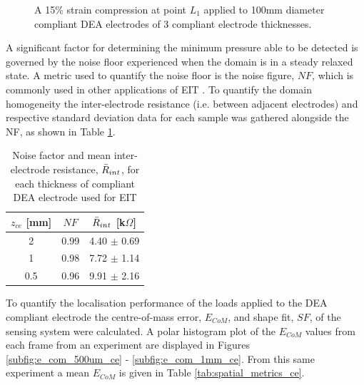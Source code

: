 \begin{figure}[H]
	\vspace{0.1cm}
	\caption{A 15\% strain compression at point $L_1$ applied to 100mm diameter compliant DEA electrodes of 3 compliant electrode thicknesses.}
	\label{fig:EIT_thickness_compare}
\end{figure}
A significant factor for determining the minimum pressure able to be detected is governed by the noise floor experienced when the domain is in a steady relaxed state. A metric used to quantify the noise floor is the noise figure, $N\!F$, which is commonly used in other applications of EIT \cite{Adler2009, Ellingham2024}. To quantify the domain homogeneity the inter-electrode resistance (i.e. between adjacent electrodes) and respective standard deviation data for each sample was gathered alongside the NF, as shown in Table \ref{tab:NF_vals}.
\begin{table}[H]
	\centering
	\caption{Noise factor and mean inter-electrode resistance, $\Bar{R}_{int}$, for each thickness of compliant DEA electrode used for EIT}
	\label{tab:NF_vals}
	\begin{tabular}{c|c|c}
		$z_{ce}$ [mm] & $N\!F$ & $\Bar{R}_{int}$ [k$\Omega$]\\
		\hline
		2 & 0.99 & 4.40 $\pm$ 0.69 \\
		1 & 0.98 & 7.72 $\pm$ 1.14\\
		0.5 & 0.96 & 9.91 $\pm$ 2.16\\
	\end{tabular}
\end{table}
To quantify the localisation performance of the loads applied to the DEA compliant electrode the centre-of-mass error, $E_{CoM}$, and shape fit, $S\!F$, of the sensing system were calculated.	A polar histogram plot of the $E_{CoM}$ values from each frame from an experiment are displayed in Figures \ref{subfig:e_com_500um_ce} - \ref{subfig:e_com_1mm_ce}. From this same experiment a mean $E_{CoM}$ is given in Table \ref{tab:spatial_metrics_ce}.

